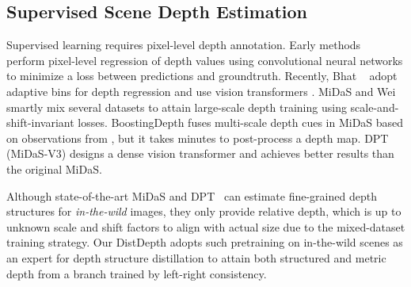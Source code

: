 \documentclass[10pt,twocolumn,letterpaper]{article}
\begin{document}
\subsection{Supervised Scene Depth Estimation}
\label{sec:supervised}
Supervised learning requires pixel-level depth annotation. Early methods~\cite{eigen2014depth, xu2018structured, eigen2015predicting, liu2015deep, laina2016deeper, fu2018deep,yin2019enforcing,lee2019big,ramamonjisoa2019sharpnet,Hu2019RevisitingSI} perform pixel-level regression of depth values using convolutional neural networks to minimize a loss between predictions and groundtruth. Recently, Bhat \etal~\cite{bhat2021adabins} adopt adaptive bins for depth regression and use vision transformers \cite{dosovitskiy2020image}. MiDaS \cite{Ranftl2020} and Wei \etal~\cite{yin2021learning} smartly mix several datasets to attain large-scale depth training using scale-and-shift-invariant losses. BoostingDepth \cite{miangoleh2021boosting} fuses multi-scale depth cues in MiDaS based on observations from \cite{hu2019visualization}, but it takes minutes to post-process a depth map. DPT (MiDaS-V3) \cite{Ranftl2021} designs a dense vision transformer and achieves better results than the original MiDaS. 

Although state-of-the-art MiDaS \cite{Ranftl2020} and DPT~\cite{Ranftl2021} can estimate fine-grained depth structures for \textit{in-the-wild} images, they only provide relative depth, which is up to unknown scale and shift factors to align with actual size due to the mixed-dataset training strategy. Our DistDepth adopts such pretraining on in-the-wild scenes as an expert for depth structure distillation to attain both structured and metric depth from a branch trained by left-right consistency.
\end{document}

